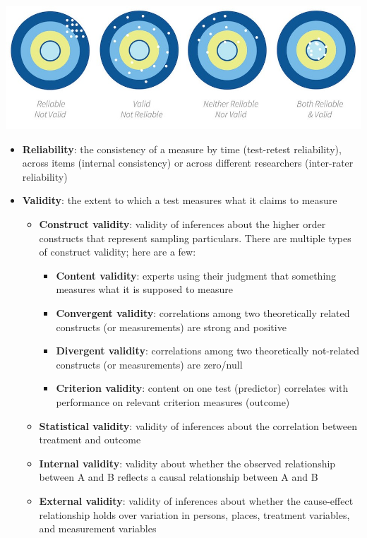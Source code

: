 \documentclass[
]{book}
\providecommand{\tightlist}{%
  \setlength{\itemsep}{0pt}\setlength{\parskip}{0pt}}
\begin{document}
\includegraphics{images/01-intro/reliability-validity.jpg}

\begin{itemize}
\item
  \textbf{Reliability}: the consistency of a measure by time (test-retest reliability), across items (internal consistency) or across different researchers (inter-rater reliability)
\item
  \textbf{Validity}: the extent to which a test measures what it claims to measure

  \begin{itemize}
  \item
    \textbf{Construct validity}: validity of inferences about the higher order constructs that represent sampling particulars. There are multiple types of construct validity; here are a few:

    \begin{itemize}
    \tightlist
    \item
      \textbf{Content validity}: experts using their judgment that something measures what it is supposed to measure
    \item
      \textbf{Convergent validity}: correlations among two theoretically related constructs (or measurements) are strong and positive
    \item
      \textbf{Divergent validity}: correlations among two theoretically not-related constructs (or measurements) are zero/null
    \item
      \textbf{Criterion validity}: content on one test (predictor) correlates with performance on relevant criterion measures (outcome)
    \end{itemize}
  \item
    \textbf{Statistical validity}: validity of inferences about the correlation between treatment and outcome
  \item
    \textbf{Internal validity}: validity about whether the observed relationship between A and B reflects a causal relationship between A and B
  \item
    \textbf{External validity}: validity of inferences about whether the cause-effect relationship holds over variation in persons, places, treatment variables, and measurement variables
  \end{itemize}
\end{itemize}
\end{document}

